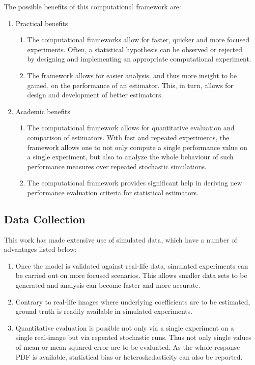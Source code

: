 The possible benefits of this computational framework are:
\begin{enumerate}
\item Practical benefits
\begin{enumerate}
\item The computational frameworks allow for faster, quicker and more focused experiments. 
Often, a statistical hypothesis can be observed or rejected by designing and implementing an appropriate computational experiment.
\item The framework allows for easier analysis, and thus more insight to be gained, on the performance of an estimator. 
This, in turn, allows for design and development of better estimators.
\end{enumerate}
\item Academic benefits
\begin{enumerate}
\item The computational framework allows for quantitative evaluation and comparison of estimators.
With fast and repeated experiments, the framework allows one to not only compute a single performance value on a single experiment, but also to analyze the whole behaviour of such performance measures over repeated stochastic simulations.
\item The computational framework provides significant help in deriving new performance evaluation criteria for statistical estimators.
\end{enumerate}
\end{enumerate}

\subsection{Data Collection}

This work has made extensive use of simulated data, which have a number of advantages listed below:
\begin{enumerate}
\item Once the model is validated against real-life data, simulated experiments can be carried out on more focused scenarios.
This allows smaller data sets to be generated and analysis can become faster and more accurate.
\item Contrary to real-life images where underlying coefficients are to be estimated, ground truth is readily available in simulated experiments.
\item Quantitative evaluation is possible not only via a single experiment on a single real-image but via repeated stochastic runs.
  Thus not only single values of mean or mean-squared-error are to be evaluated. 
As the whole response PDF is available, statistical bias or heteroskedasticity can also be reported.
\end{enumerate}

